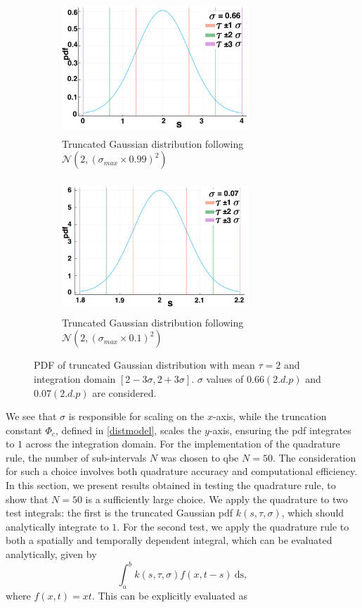 \begin{figure}[H]
    \centering
    \begin{subfigure}[b]{0.45\textwidth}
        \centering
        \includegraphics[width=7cm,height=5cm]{t2sig1.png}
        \caption{Truncated Gaussian distribution following $\mathcal{N}(2,(\sigma_{max}\times0.99)^2)$}
        \label{}
    \end{subfigure}
    \hfill
    \begin{subfigure}[b]{0.45\textwidth}
        \centering
        \includegraphics[width=7cm,height=5cm]{t2sig2.png}
        \caption{Truncated Gaussian distribution following $\mathcal{N}(2,(\sigma_{max}\times0.1)^2)$}
        \label{}
    \end{subfigure}
    \caption{PDF of truncated Gaussian distribution with mean $\tau=2$ and integration domain $[2-3\sigma,2+3\sigma]$. $\sigma$ values of $0.66(2.d.p)$ and $0.07(2.d.p)$ are considered.}
    \label{fig:pdf2}
\end{figure}
We see that $\sigma$ is responsible for scaling on the $x$-axis, while the truncation constant $\Phi_c$, defined in \eqref{distmodel}, scales the $y$-axis, ensuring the pdf integrates to $1$ across the integration domain. For the implementation of the quadrature rule, the number of sub-intervals $N$ was chosen to qbe $N=50$. The consideration for such a choice involves both quadrature accuracy and computational efficiency. In this section, we present results obtained in testing the quadrature rule, to show that $N=50$ is a sufficiently large choice. We apply the quadrature to two test integrals: the first is the truncated Gaussian pdf $k(s,\tau,\sigma)$, which should analytically integrate to $1$. For the second test, we apply the quadrature rule to both a spatially and temporally dependent integral, which can be evaluated analytically, given by
\begin{equation}\label{testint}
\int_a^bk(s,\tau,\sigma)f(x,t-s)\ \text{ds},
\end{equation}
where $f(x,t)=xt$. This can be explicitly evaluated as

